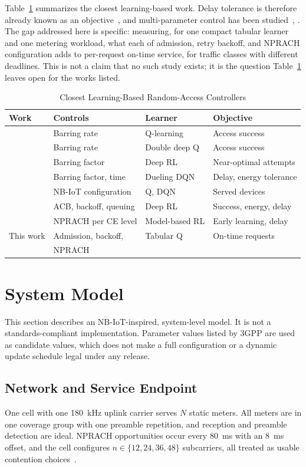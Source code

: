 \documentclass[conference]{IEEEtran}
\begin{document}
Table~\ref{tab:related} summarizes the closest learning-based work. Delay tolerance
is therefore already known as an objective~\cite{bui}, and multi-parameter
control has been studied~\cite{jiang19}, \cite{jiang21}. The gap addressed here is
specific: measuring, for one compact tabular learner and one metering workload,
what each of admission, retry backoff, and NPRACH configuration adds to
per-request on-time service, for traffic classes with different deadlines. This
is not a claim that no such study exists; it is the question Table~\ref{tab:related}
leaves open for the works listed.

\begin{table}[!t]
\caption{Closest Learning-Based Random-Access Controllers}
\label{tab:related}
\centering
\begin{tabular}{@{}l l l l@{}}
\hline
\textbf{Work} & \textbf{Controls} & \textbf{Learner} & \textbf{Objective} \\
\hline
\cite{tello} & Barring rate & Q-learning & Access success \\
\cite{pacheco} & Barring rate & Double deep Q & Access success \\
\cite{hadjadj} & Barring factor & Deep RL & Near-optimal attempts \\
\cite{bui} & Barring factor, time & Dueling DQN & Delay, energy tolerance \\
\cite{jiang19} & NB-IoT configuration & Q, DQN & Served devices \\
\cite{jiang21} & ACB, backoff, queuing & Deep RL & Success, energy, delay \\
\cite{alcaraz} & NPRACH per CE level & Model-based RL & Early learning, delay \\
This work & Admission, backoff, & Tabular Q & On-time requests \\
 & NPRACH & & \\
\hline
\end{tabular}
\end{table}

\section{System Model}
\label{sec:model}
This section describes an NB-IoT-inspired, system-level model. It is not a
standards-compliant implementation. Parameter values listed by 3GPP are used as
candidate values, which does not make a full configuration or a dynamic update
schedule legal under any release.

\subsection{Network and Service Endpoint}
One cell with one 180~kHz uplink carrier serves $N$ static meters. All meters are
in one coverage group with one preamble repetition, and reception and preamble
detection are ideal. NPRACH opportunities occur every 80~ms with an 8~ms offset,
and the cell configures $n \in \{12, 24, 36, 48\}$ subcarriers, all treated as
usable contention choices~\cite{ts36331}.
\end{document}
